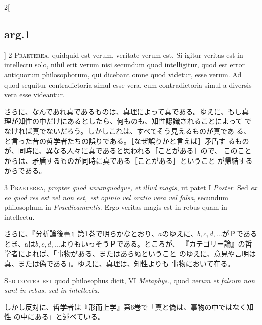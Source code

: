 \documentclass[paper=a4paper,fontsize=10pt,jafontsize=9pt,titlepage]{jlreq}
\begin{document}
\begin{paracol}{2}[\subsection{arg.1}]
{\scshape 2 Praeterea}, quidquid est verum, veritate verum est. Si
igitur veritas est in intellectu solo, nihil erit verum nisi secundum
quod intelligitur, quod est error antiquorum philosophorum, qui
dicebant omne quod videtur, esse verum. Ad quod sequitur
contradictoria simul esse vera, cum contradictoria simul a diversis
vera esse videantur.

\switchcolumn

さらに、なんであれ真であるものは、真理によって真である。ゆえに、もし真
 理が知性の中だけにあるとしたら、何ものも、知性認識されることによって
 でなければ真でないだろう。しかしこれは、すべてそう見えるものが真であ
 る、と言った昔の哲学者たちの誤りである。［なぜ誤りかと言えば］矛盾す
 るものが、同時に、異なる人々に真であると思われる［ことがある］ので、
 このことからは、矛盾するものが同時に真である［ことがある］ということ
 が帰結するからである。



{\scshape 3 Praeterea}, {\itshape propter quod unumquodque, et illud
magis}, ut patet I {\itshape Poster}. Sed {\itshape ex eo quod res est
vel non est, est opinio vel oratio vera vel falsa}, secundum
philosophum in {\itshape Praedicamentis}. Ergo veritas magis est in
rebus quam in intellectu.

\switchcolumn

さらに、『分析論後書』第1巻で明らかなとおり、$a$のゆえに、$b, c, d,
...$がＰであるとき、aは$b, c, d, ...$よりもいっそうＰである。ところが、
『カテゴリー論』の哲学者によれば、「事物がある、またはあらぬということ
のゆえに、意見や言明は真、または偽である」。ゆえに、真理は、知性よりも
事物において在る。

\switchcolumn*[\subsection{s.c.}]


{\scshape Sed contra est} quod philosophus dicit, VI {\itshape
Metaphys}., quod {\itshape verum et falsum non sunt in rebus, sed in
intellectu}.

\switchcolumn

しかし反対に、哲学者は『形而上学』第6巻で「真と偽は、事物の中ではなく知性
 の中にある」と述べている。




\end{paracol}
\end{document}
